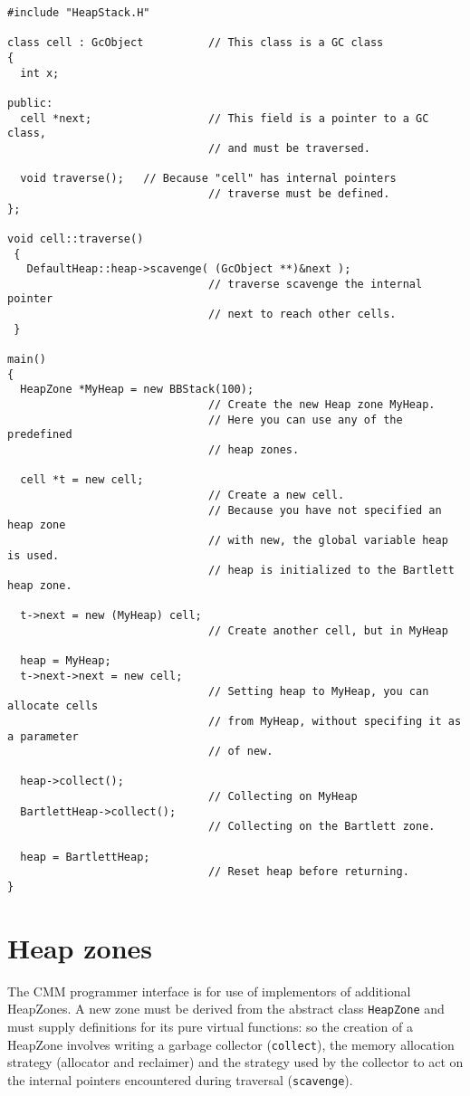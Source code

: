 \begin{verbatim}
#include "HeapStack.H"

class cell : GcObject          // This class is a GC class
{
  int x;

public: 
  cell *next;                  // This field is a pointer to a GC class,
                               // and must be traversed.

  void traverse();   // Because "cell" has internal pointers
                               // traverse must be defined.
};

void cell::traverse()
 { 
   DefaultHeap::heap->scavenge( (GcObject **)&next ); 
                               // traverse scavenge the internal pointer
                               // next to reach other cells.
 }

main()
{
  HeapZone *MyHeap = new BBStack(100);
                               // Create the new Heap zone MyHeap.
                               // Here you can use any of the predefined
                               // heap zones.

  cell *t = new cell;
                               // Create a new cell. 
                               // Because you have not specified an heap zone
                               // with new, the global variable heap is used.
                               // heap is initialized to the Bartlett heap zone.

  t->next = new (MyHeap) cell;
                               // Create another cell, but in MyHeap

  heap = MyHeap;
  t->next->next = new cell;
                               // Setting heap to MyHeap, you can allocate cells
                               // from MyHeap, without specifing it as a parameter
                               // of new.

  heap->collect();
                               // Collecting on MyHeap
  BartlettHeap->collect();
                               // Collecting on the Bartlett zone.

  heap = BartlettHeap;
                               // Reset heap before returning.
}
\end{verbatim}

\section {Heap zones}

The CMM programmer interface is for use of implementors of
additional HeapZones. A new zone must be derived from the abstract
class \verb|HeapZone| and must supply definitions for its pure virtual
functions: so the creation of a HeapZone involves writing a garbage
collector (\verb|collect|), the memory allocation strategy (allocator and
reclaimer) and the strategy used by the collector to act on the
internal pointers encountered during traversal (\verb|scavenge|).

